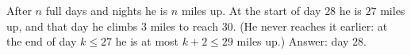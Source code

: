 After $n$ full days and nights he is $n$ miles up. At the start of day $28$ he is $27$ miles up, and that day he climbs $3$ miles to reach $30$. (He never reaches it earlier: at the end of day $k\le27$ he is at most $k+2\le29$ miles up.) Answer: day $\boxed{28}$.
